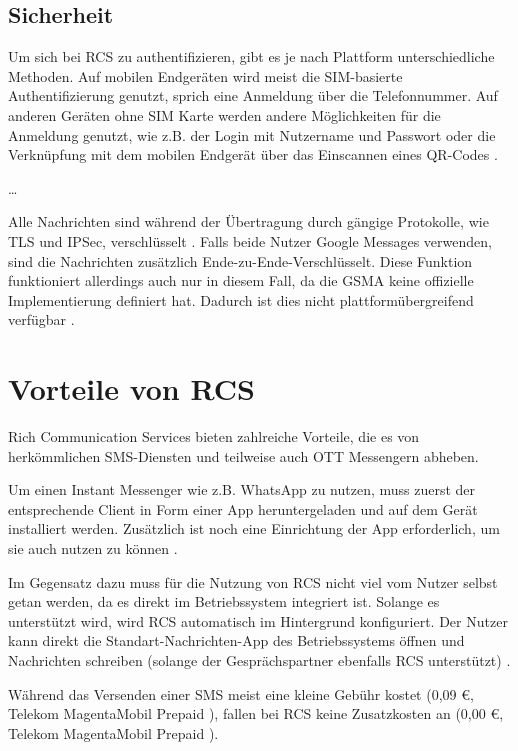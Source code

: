 \documentclass[conference]{IEEEtran}
\begin{document}
\subsection{Sicherheit}

Um sich bei RCS zu authentifizieren, gibt es je nach Plattform unterschiedliche Methoden.
Auf mobilen Endgeräten wird meist die SIM-basierte Authentifizierung genutzt, sprich eine Anmeldung über die Telefonnummer. Auf anderen Geräten ohne SIM Karte werden andere Möglichkeiten für die Anmeldung genutzt, wie z.B. der Login mit Nutzername und Passwort oder die Verknüpfung mit dem mobilen Endgerät über das Einscannen eines QR-Codes \cite{uniprof}.

\dots

Alle Nachrichten sind während der Übertragung durch gängige Protokolle, wie TLS und IPSec, verschlüsselt \cite{uniprof}.
Falls beide Nutzer Google Messages verwenden, sind die Nachrichten zusätzlich Ende-zu-Ende-Verschlüsselt.
Diese Funktion funktioniert allerdings auch nur in diesem Fall, da die GSMA keine offizielle Implementierung definiert hat.
Dadurch ist dies nicht plattformübergreifend verfügbar \cite{googlemessagessecure}.


\section{Vorteile von RCS}

Rich Communication Services bieten zahlreiche Vorteile, die es von herkömmlichen SMS-Diensten und teilweise auch OTT Messengern abheben.

Um einen Instant Messenger wie z.B. WhatsApp zu nutzen, muss zuerst der entsprechende Client in Form einer App heruntergeladen und auf dem Gerät installiert werden.
Zusätzlich ist noch eine Einrichtung der App erforderlich, um sie auch nutzen zu können \cite{5gmsg,rcsmno}.

Im Gegensatz dazu muss für die Nutzung von RCS nicht viel vom Nutzer selbst getan werden, da es direkt im Betriebssystem integriert ist.
Solange es unterstützt wird, wird RCS automatisch im Hintergrund konfiguriert.
Der Nutzer kann direkt die Standart-Nachrichten-App des Betriebssystems öffnen und Nachrichten schreiben (solange der Gesprächspartner ebenfalls RCS unterstützt) \cite{5gmsg,rcsmno}.

Während das Versenden einer SMS meist eine kleine Gebühr kostet (0,09 €, Telekom MagentaMobil Prepaid \cite{telekomsms}), fallen bei RCS keine Zusatzkosten an (0,00 €, Telekom MagentaMobil Prepaid \cite{telekomrcs}).
\end{document}
